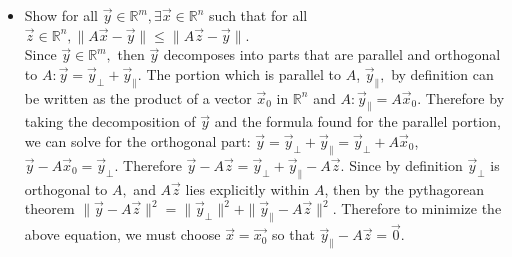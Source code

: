 \documentclass[12pt, letterpaper]{article}
\newcommand{\R}{\mathbb{R}}
\begin{document}
\begin{enumerate}
\begin{itemize}
\[\begin{bmatrix}
Col_1 (A)  \cdot  \hat{u}_1 & \cdots & Col_n (A) \cdot \hat{u}_1 \\
Col_1 (A)  \cdot  \hat{u}_2 & \cdots & Col_n (A) \cdot \hat{u}_2 
\end{bmatrix}.\]
	Therefore \[R^T R = \begin{bmatrix}
	\sum^n_{j=1}(Col_j (A)  \cdot  \hat{u}_1)^2 & \sum^n_{j=1}(Col_j (A)  \cdot  \hat{u}_1)(Col_j (A)  \cdot  \hat{u}_2)\\
	\sum^n_{j=1}(Col_j (A)  \cdot  \hat{u}_1)(Col_j (A)  \cdot  \hat{u}_2) & \sum^n_{j=1}(Col_j (A)  \cdot  \hat{u}_2)^2
	\end{bmatrix} \]\\	
	\[
	=\begin{bmatrix}
		\|A^T \hat{u}_1\|^2 & (A^T \hat{u}_1) \cdot (A^T \hat{u}_2)\\
		(A^T \hat{u}_1) \cdot (A^T \hat{u}_2) & \|A^T \hat{u}_2\|^2 
	\end{bmatrix} .\]\\
	Therefore $det(A^T A) = (\|A^T \hat{u}_1\|\|A^T \hat{u}_2\| )^2 -((A^T \hat{u}_1) \cdot (A^T \hat{u}_2))^2 = (\|A^T \hat{u}_1\|\|A^T \hat{u}_2\| + (A^T \hat{u}_1) \cdot (A^T \hat{u}_2))(\|A^T \hat{u}_1\|\|A^T \hat{u}_2\| - (A^T \hat{u}_1) \cdot (A^T \hat{u}_2)) $.  The only way for this determinate to be 0 is if $A^T \hat{u}_1 = A^T \hat{u}_2$.  However this implies that the first row of $R$ is equal to the second.  In that case $R$ would have a rank of 1, which would contradict the fact that $rank(A) = 2.$  Therefore $det(A) \neq 0,$ and thus $A^T A$ has an inverse.
	\item Show for all $\vec{y} \in \R^m, \exists \vec{x} \in \R^n $ such that for all $\vec{z} \in \R^n, \|A\vec{x} - \vec{y}\| \leq \|A\vec{z} - \vec{y}\|$.\\
	Since $\vec{y} \in \R^m,$ then $\vec{y}$ decomposes into parts that are parallel and orthogonal to $A: \vec{y} = \vec{y}_\perp + \vec{y}_\parallel.$  The portion which is parallel to $A$, $\vec{y}_\parallel,$ by definition can be written as the product of a vector $\vec{x}_0$ in $\R^n$ and $A: \vec{y}_\parallel = A \vec{x}_0.$  Therefore by taking the decomposition of $\vec{y}$ and the formula found for the parallel portion, we can solve for the orthogonal part: $\vec{y} = \vec{y}_\perp + \vec{y}_\parallel = \vec{y}_\perp + A\vec{x}_0$, $\vec{y} - A \vec{x}_0 = \vec{y}_\perp.$  Therefore $\vec{y} - A\vec{z} = \vec{y}_\perp + \vec{y}_\parallel - A \vec{z}.$  Since by definition $\vec{y}_\perp$ is orthogonal to $A,$ and $A\vec{z}$ lies explicitly within $A$, then by the pythagorean theorem $\|\vec{y} - A\vec{z}\|^2 = \|\vec{y}_\perp\|^2 + \|\vec{y}_\parallel - A \vec{z}\|^2.$  Therefore to minimize the above equation, we must choose $\vec{x} = \vec{x_0}$ so that $\vec{y}_\parallel - A \vec{z} = \vec{0}.$  

\end{itemize}
\end{enumerate}
\end{document}
